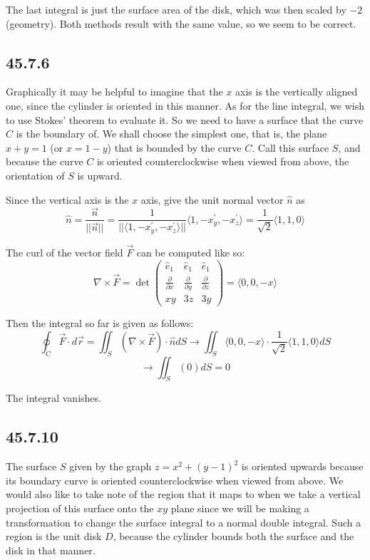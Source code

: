 \documentclass{article}
\begin{document}
The last integral is just the surface area of the disk, which was then scaled by $-2$ (geometry). Both methods result with the same value, so we seem to be correct.

\subsection{45.7.6}

Graphically it may be helpful to imagine that the $x$ axis is the vertically aligned one, since the cylinder is oriented in this manner. As for the line integral, we wish to use Stokes' theorem to evaluate it. So we need to have a surface that the curve $C$ is the boundary of. We shall choose the simplest one, that is, the plane $x+y=1$ (or $x = 1-y$) that is bounded by the curve $C$. Call this surface $S$, and because the curve $C$ is oriented counterclockwise when viewed from above, the orientation of $S$ is upward.

Since the vertical axis is the $x$ axis, give the unit normal vector $\hat{n}$ as $$\hat{n} = \frac{\vec{n}}{||\vec{n}||} = \frac{1}{||\langle 1, -x^{\prime}_y ,-x^{\prime}_z \rangle||}\langle 1, -x^{\prime}_y ,-x^{\prime}_z \rangle = \frac{1}{\sqrt{2}}\langle 1, 1 ,0 \rangle$$

The curl of the vector field $\vec{F}$ can be computed like so:
$$\nabla \times \vec{F} = \det \begin{pmatrix}
    \hat{e}_1 & \hat{e}_1 & \hat{e}_1 \\
    \frac{\partial}{\partial x} & \frac{\partial}{\partial y} & \frac{\partial}{\partial z} \\
    xy & 3z & 3y
\end{pmatrix} = \langle 0, 0 ,-x \rangle$$

Then the integral so far is given as follows:
$$\oint_C \vec{F}\cdot d\vec{r} = \iint_S \left(\nabla\times\vec{F}\right)\cdot \hat{n}dS \to \iint_S \langle 0, 0 ,-x \rangle \cdot \frac{1}{\sqrt{2}}\langle 1, 1 ,0 \rangle dS $$
$$\to \iint_S (0) dS = 0$$

The integral vanishes.

\subsection{45.7.10}

The surface $S$ given by the graph $z=x^2+(y-1)^2$ is oriented upwards because its boundary curve is oriented counterclockwise when viewed from above. We would also like to take note of the region that it maps to when we take a vertical projection of this surface onto the $xy$ plane since we will be making a transformation to change the surface integral to a normal double integral. Such a region is the unit disk $D$, because the cylinder bounds both the surface and the disk in that manner.
\end{document}
